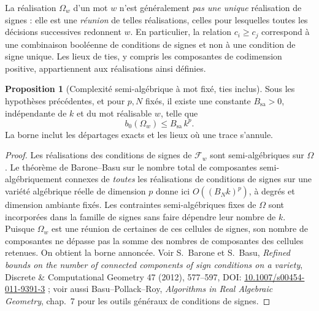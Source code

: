 \documentclass[11pt,a4paper]{article}
\theoremstyle{definition}
\newtheorem{propositionthm}[definition]{Proposition}
\theoremstyle{remark}
\begin{document}
La réalisation $\Omega_w$ d'un mot $w$ n'est généralement \emph{pas une unique} réalisation de signes : elle est une \emph{réunion} de telles réalisations, celles pour lesquelles toutes les décisions successives redonnent $w$. En particulier, la relation $c_i\ge c_j$ correspond à une combinaison booléenne de conditions de signes et non à une condition de signe unique. Les lieux de ties, y compris les composantes de codimension positive, appartiennent aux réalisations ainsi définies.

\begin{propositionthm}[Complexité semi-algébrique à mot fixé, ties inclus]
\label{prop:complexite-mot-fixe}
Sous les hypothèses précédentes, et pour $p,N$ fixés, il existe une constante $B_{\mathrm{sa}}>0$, indépendante de $k$ et du mot réalisable $w$, telle que
\[
 \boxed{b_0(\Omega_w)\le B_{\mathrm{sa}}\,k^p.}
\]
La borne inclut les départages exacts et les lieux où une trace s'annule.
\end{propositionthm}
\begin{proof}
Les réalisations des conditions de signes de $\mathscr F_w$ sont semi-algébriques sur $\Omega$. Le théorème de Barone--Basu sur le nombre total de composantes semi-algébriquement connexes de \emph{toutes} les réalisations de conditions de signes sur une variété algébrique réelle de dimension $p$ donne ici $O((B_Nk)^p)$, à degrés et dimension ambiante fixés. Les contraintes semi-algébriques fixes de $\Omega$ sont incorporées dans la famille de signes sans faire dépendre leur nombre de $k$. Puisque $\Omega_w$ est une réunion de certaines de ces cellules de signes, son nombre de composantes ne dépasse pas la somme des nombres de composantes des cellules retenues. On obtient la borne annoncée. Voir S.~Barone et S.~Basu, \emph{Refined bounds on the number of connected components of sign conditions on a variety}, Discrete \& Computational Geometry 47 (2012), 577--597, DOI: \href{https://doi.org/10.1007/s00454-011-9391-3}{10.1007/s00454-011-9391-3} ; voir aussi Basu--Pollack--Roy, \emph{Algorithms in Real Algebraic Geometry}, chap.~7 pour les outils généraux de conditions de signes.
\end{proof}
\end{document}
